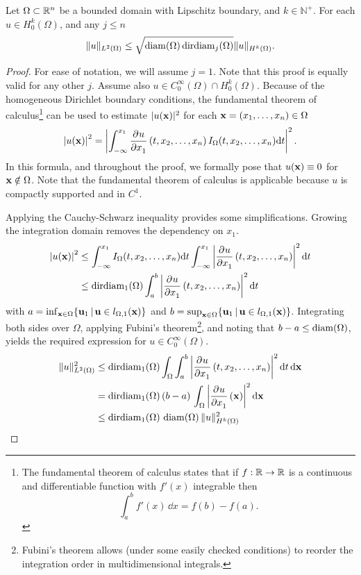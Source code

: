 \begin{lemma}
  \label{lem:friederichs_like}
  Let $\Omega \subset \mathbb{R}^n$ be a bounded domain with Lipschitz boundary, and $k \in \mathbb{N}^{+}$. For each $u \in H_0^k(\Omega)$, and any $j \leq n$
  \begin{equation}
    \label{equ:friederichs_like}
    \| u \|_{L^2(\Omega)} \leq \sqrt{\operatorname{diam}(\Omega) \operatorname{dirdiam}_j(\Omega)} \| u \|_{H^k(\Omega)} \text{.}
  \end{equation}
\end{lemma}
\begin{proof}
  For ease of notation, we will assume $j = 1$. Note that this proof is equally valid for any other $j$. Assume also $u \in C^\infty_0(\Omega) \cap H_0^k(\Omega)$. Because of the homogeneous Dirichlet boundary conditions,
  the fundamental theorem of calculus\footnote{The fundamental theorem of calculus states that if $f : \mathbb{R} \to \mathbb{R}$ is a continuous and differentiable function with $f'(x)$ integrable then
    $$
      \int_a^b f'(x) \, \dd x = f(b) - f(a)\text{.}
    $$} can be used to estimate $|u(\vb{x})|^2$ for each $\vb{x} = (x_1, \dots, x_n) \in \Omega$
  $$
    \left|u(\vb{x})\right|^2 = \left|\int_{-\infty}^{x_1} \pdv[]{u}{x_1}\left(t, x_2, \dots, x_{n}\right)I_\Omega(t,x_2, \dots, x_n)\dd t\right|^2 \text{.}
  $$
  In this formula, and throughout the proof, we formally pose that $u(\vb{x}) \equiv 0$ for $\vb{x} \notin \Omega$. Note that the fundamental theorem of calculus is applicable because $u$ is compactly supported and in $C^1$.

  Applying the Cauchy-Schwarz inequality provides some simplifications. Growing the integration domain removes the dependency on $x_1$.
  \begin{align*}
    \left|u(\vb{x})\right|^2 & \leq \int_{-\infty}^{x_1} I_\Omega(t,x_2, \dots, x_n) \dd t \int_{-\infty}^{x_1} \left|\pdv[]{u}{x_1}\left(t,x_2, \dots, x_n\right)\right|^2\dd t \\
                             & \leq \operatorname{dirdiam}_1(\Omega) \int_{a}^{b} \left|\pdv[]{u}{x_1}\left(t, x_2, \dots, x_n\right)\right|^2\dd t
  \end{align*}
  with $a = \inf_{\vb{x} \in \Omega}\{\vb{u}_1 \,|\, \vb{u} \in l_{\Omega, 1}(\vb{x})\}$ and $b = \sup_{\vb{x} \in \Omega}\{\vb{u}_1 \,|\, \vb{u} \in l_{\Omega, 1}(\vb{x})\}$. Integrating both sides over $\Omega$, applying Fubini's theorem\footnote{Fubini's theorem allows (under some easily checked conditions) to reorder the integration order in multidimensional integrals.}, and noting that $b - a \leq \operatorname{diam}(\Omega)$, yields the required expression for $u \in C^\infty_0(\Omega)$.
  \begin{align*}
    \|u\|_{L^2(\Omega)}^2 & \leq \operatorname{dirdiam}_1(\Omega) \int_\Omega \int_{a}^{b} \left|\pdv[]{u}{x_1}\left(t, x_2, \dots, x_{n}\right)\right|^2\dd t \, \dd \vb{x} \\
                          & = \operatorname{dirdiam}_1(\Omega) \, (b - a) \, \int_{\Omega} \left|\pdv[]{u}{x_1}\left(\vb{x}\right)\right|^2 \dd \vb{x}                       \\
                          & \leq \operatorname{dirdiam}_1(\Omega) \, \operatorname{diam}(\Omega) \, \| u \|^2_{H^k(\Omega)}
  \end{align*}


\end{proof}
